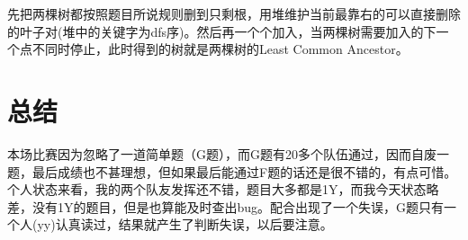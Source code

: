 \documentclass[a4paper, 11pt, nofonts, nocap, fancyhdr]{ctexart}
\begin{document}
先把两棵树都按照题目所说规则删到只剩根，用堆维护当前最靠右的可以直接删除的叶子对(堆中的关键字为dfs序)。然后再一个个加入，当两棵树需要加入的下一个点不同时停止，此时得到的树就是两棵树的Least Common Ancestor。

\section{总结}

本场比赛因为忽略了一道简单题（G题），而G题有20多个队伍通过，因而自废一题，最后成绩也不甚理想，但如果最后能通过F题的话还是很不错的，有点可惜。个人状态来看，我的两个队友发挥还不错，题目大多都是1Y，而我今天状态略差，没有1Y的题目，但是也算能及时查出bug。配合出现了一个失误，G题只有一个人(yy)认真读过，结果就产生了判断失误，以后要注意。
\end{document}
